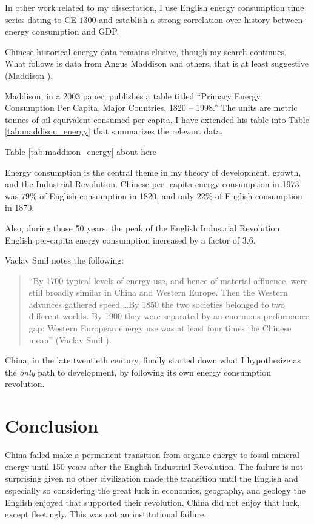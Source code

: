 \documentclass[12pt]{article}
\numberwithin{equation}{section}
\begin{document}
	In other work related to my dissertation, I use English energy consumption time series dating to CE $1300$ and establish a strong correlation over history between energy consumption and GDP.
	
	Chinese historical energy data remains elusive, though my search continues. What follows is data from Angus Maddison and others, that is at least suggestive (Maddison \citeyear[p.~10]{maddison_growth_2003}).
	
	Maddison, in a 2003 paper, publishes a table titled ``Primary Energy Consumption Per Capita, Major Countries, 1820 -- 1998.'' The units are metric tonnes of oil equivalent consumed per capita. I have extended his table into Table \ref{tab:maddison_energy} that summarizes the relevant data.

\begin{center}
Table \ref{tab:maddison_energy} about here
\end{center}	

	
	Energy consumption is the central theme in my theory of development, growth, and the Industrial Revolution. Chinese per- capita energy consumption in 1973 was $79\%$ of English consumption in 1820, and only $22\%$ of English consumption in 1870.
	
	Also, during those 50 years, the peak of the English Industrial Revolution, English per-capita energy consumption increased by a factor of 3.6. 
	
	Vaclav Smil notes the following:
	
	\begin{quotation}
	``By 1700 typical levels of energy use, and hence of material affluence, were still broadly similar in China and Western Europe. Then the Western advances gathered speed \ldots By 1850 the two societies belonged to two different worlds. By 1900 they were separated by an enormous performance gap: Western European energy use was at least four times the Chinese mean'' (Vaclav Smil \citeyear[p.~234]{smil_energy_1994}).
	\end{quotation} 
	
	China, in the late twentieth century, finally started down what I hypothesize as the \textit{only} path to development, by following its own energy consumption revolution.
	
	\section*{Conclusion}

	China failed make a permanent transition from organic energy to fossil mineral energy until 150 years after the English Industrial Revolution. The failure is not surprising given no other civilization made the transition until the English and especially so considering the great luck in economics, geography, and geology the English enjoyed that supported their revolution. China did not enjoy that luck, except fleetingly. This was not an institutional failure.
	
\end{document}
